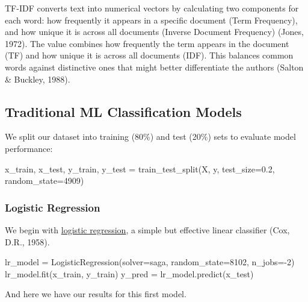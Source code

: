 \documentclass[
]{article}
\newenvironment{Shaded}{}{}
\newcommand{\DecValTok}[1]{\textcolor[rgb]{0.25,0.63,0.44}{#1}}
\newcommand{\FloatTok}[1]{\textcolor[rgb]{0.25,0.63,0.44}{#1}}
\newcommand{\NormalTok}[1]{#1}
\newcommand{\OperatorTok}[1]{\textcolor[rgb]{0.40,0.40,0.40}{#1}}
\newcommand{\StringTok}[1]{\textcolor[rgb]{0.25,0.44,0.63}{#1}}
\begin{document}
TF-IDF converts text into numerical vectors by calculating two
components for each word: how frequently it appears in a specific
document (Term Frequency), and how unique it is across all documents
(Inverse Document Frequency) (Jones, 1972). The value combines how
frequently the term appears in the document (TF) and how unique it is
across all documents (IDF). This balances common words against
distinctive ones that might better differentiate the authors (Salton \&
Buckley, 1988).

\subsection{Traditional ML Classification
Models}\label{traditional-ml-classification-models}

We split our dataset into training (80\%) and test (20\%) sets to
evaluate model performance:

\begin{Shaded}
\begin{Highlighting}[]
\NormalTok{x\_train, x\_test, y\_train, y\_test }\OperatorTok{=}\NormalTok{ train\_test\_split(X, y, test\_size}\OperatorTok{=}\FloatTok{0.2}\NormalTok{, random\_state}\OperatorTok{=}\DecValTok{4909}\NormalTok{)}
\end{Highlighting}
\end{Shaded}

\subsubsection{Logistic Regression}\label{logistic-regression}

We begin with
\href{https://en.wikipedia.org/wiki/Logistic_regression}{logistic
regression}, a simple but effective linear classifier (Cox, D.R., 1958).

\begin{Shaded}
\begin{Highlighting}[]
\NormalTok{lr\_model }\OperatorTok{=}\NormalTok{ LogisticRegression(solver}\OperatorTok{=}\StringTok{\textquotesingle{}saga\textquotesingle{}}\NormalTok{, random\_state}\OperatorTok{=}\DecValTok{8102}\NormalTok{, n\_jobs}\OperatorTok{={-}}\DecValTok{2}\NormalTok{)}
\NormalTok{lr\_model.fit(x\_train, y\_train)}
\NormalTok{y\_pred }\OperatorTok{=}\NormalTok{ lr\_model.predict(x\_test)}
\end{Highlighting}
\end{Shaded}

And here we have our results for this first model.
\end{document}
